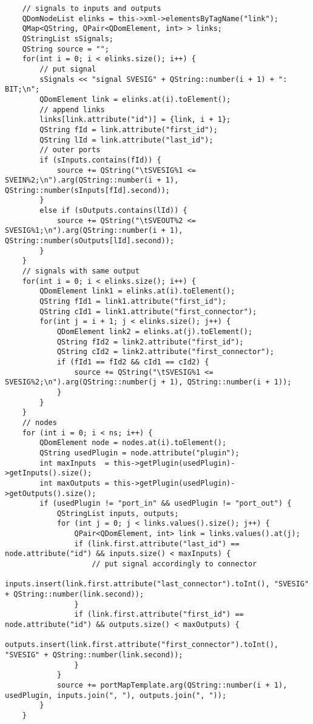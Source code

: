 \begin{lstlisting}
    // signals to inputs and outputs
    QDomNodeList elinks = this->xml->elementsByTagName("link");
    QMap<QString, QPair<QDomElement, int> > links;
    QStringList sSignals;
    QString source = "";
    for(int i = 0; i < elinks.size(); i++) {
        // put signal
        sSignals << "signal SVESIG" + QString::number(i + 1) + ": BIT;\n";
        QDomElement link = elinks.at(i).toElement();
        // append links
        links[link.attribute("id")] = {link, i + 1};
        QString fId = link.attribute("first_id");
        QString lId = link.attribute("last_id");
        // outer ports
        if (sInputs.contains(fId)) {
            source += QString("\tSVESIG%1 <= SVEIN%2;\n").arg(QString::number(i + 1), QString::number(sInputs[fId].second));
        }
        else if (sOutputs.contains(lId)) {
            source += QString("\tSVEOUT%2 <= SVESIG%1;\n").arg(QString::number(i + 1), QString::number(sOutputs[lId].second));
        }
    }
    // signals with same output
    for(int i = 0; i < elinks.size(); i++) {
        QDomElement link1 = elinks.at(i).toElement();
        QString fId1 = link1.attribute("first_id");
        QString cId1 = link1.attribute("first_connector");
        for(int j = i + 1; j < elinks.size(); j++) {
            QDomElement link2 = elinks.at(j).toElement();
            QString fId2 = link2.attribute("first_id");
            QString cId2 = link2.attribute("first_connector");
            if (fId1 == fId2 && cId1 == cId2) {
                source += QString("\tSVESIG%1 <= SVESIG%2;\n").arg(QString::number(j + 1), QString::number(i + 1));
            }
        }
    }
    // nodes
    for (int i = 0; i < ns; i++) {
        QDomElement node = nodes.at(i).toElement();
        QString usedPlugin = node.attribute("plugin");
        int maxInputs  = this->getPlugin(usedPlugin)->getInputs().size();
        int maxOutputs = this->getPlugin(usedPlugin)->getOutputs().size();
        if (usedPlugin != "port_in" && usedPlugin != "port_out") {
            QStringList inputs, outputs;
            for (int j = 0; j < links.values().size(); j++) {
                QPair<QDomElement, int> link = links.values().at(j);
                if (link.first.attribute("last_id") == node.attribute("id") && inputs.size() < maxInputs) {
                    // put signal accordingly to connector
                    inputs.insert(link.first.attribute("last_connector").toInt(), "SVESIG" + QString::number(link.second));
                }
                if (link.first.attribute("first_id") == node.attribute("id") && outputs.size() < maxOutputs) {
                    outputs.insert(link.first.attribute("first_connector").toInt(), "SVESIG" + QString::number(link.second));
                }
            }
            source += portMapTemplate.arg(QString::number(i + 1), usedPlugin, inputs.join(", "), outputs.join(", "));
        }
    }


\end{lstlisting}
